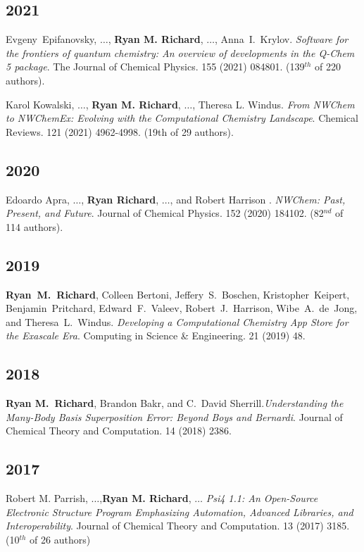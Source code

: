 \documentclass[11pt,a4paper,sans]{moderncv}
\begin{document}
\subsection{2021}
\begin{etaremune}
	\item{Evgeny~Epifanovsky, $\ldots$, \textbf{Ryan M. Richard}, $\ldots$,
	Anna~I.~Krylov. \textit{Software for the frontiers of quantum chemistry: An
	overview of developments in the Q-Chem 5 package}. The Journal of Chemical
	Physics. 155 (2021) 084801. (139$^{th}$ of 220 authors).}
	\item{Karol Kowalski, $\ldots$, \textbf{Ryan M. Richard}, $\ldots$, Theresa L. Windus. \textit{From NWChem to NWChemEx: Evolving with the Computational Chemistry Landscape}. Chemical Reviews. 121 (2021) 4962-4998. (19th of 29 authors).}
	\subsection{2020}
	\item{Edoardo Apra, $\ldots$, \textbf{Ryan Richard}, $\ldots$, and Robert Harrison . \textit{NWChem: Past, Present, and Future}. Journal of Chemical Physics. 152 (2020) 184102. (82$^{nd}$ of 114 authors).}
	\subsection{2019}
	\item{\textbf{Ryan~M.~Richard}, Colleen Bertoni, Jeffery~S.~Boschen, Kristopher~Keipert, Benjamin~Pritchard, Edward~F.~Valeev, Robert~J.~Harrison, Wibe~A.~de~Jong, and Theresa~L.~Windus. \textit{Developing a Computational Chemistry App Store for the Exascale Era}. Computing in Science \& Engineering. 21 (2019) 48.}
	\subsection{2018}
	\item{\textbf{Ryan M.~Richard}, Brandon Bakr, and C.~David Sherrill.\emph{Understanding the Many-Body Basis Superposition Error: Beyond Boys and Bernardi}. Journal of Chemical Theory and Computation. 14 (2018) 2386.}
	\subsection{2017}
	\item{Robert M. Parrish, $\ldots$,\textbf{Ryan M. Richard}, $\ldots$ \emph{Psi4 1.1: An Open-Source Electronic Structure Program Emphasizing Automation, Advanced Libraries, and Interoperability}.  Journal of Chemical Theory and Computation. 13 (2017) 3185. (10$^{th}$ of 26 authors)}

\end{etaremune}
\end{document}
